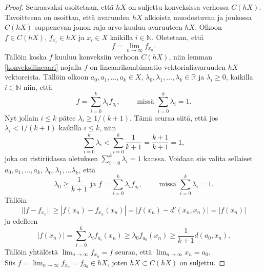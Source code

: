 \documentclass[12pt,a4paper,leqno]{report}
\newcommand{\R}{\mathbb{R}}
\newcommand{\N}{\mathbb{N}}
\theoremstyle{plain}
\theoremstyle{definition}
\theoremstyle{remark}
\begin{document}
\begin{proof}
Seuraavaksi osoitetaan, että $hX$ on suljettu konveksissa verhossa $C(hX)$. 
Tavoitteena on osoittaa, että avaruuden $hX$ alkioista muodostuvan ja joukossa $C(hX)$ suppenevan jonon raja-arvo kuuluu avaruuteen $ hX$. 
Olkoon $f\in C(hX)$, $f_{x_i}\in hX$ ja $ x_i\in X$ kaikilla $ i\in \N$. 
Oletetaan, että 
$$f=\lim_{n\rightarrow\infty} f_{x_n}.$$ 
Tällöin koska $f$ kuuluu konveksiin verhoon $C(hX)$, niin lemman \ref{konveksilineaari} nojalla $f$ on lineaarikombinaatio vektorialiavaruuden $hX$ vektoreista. Tällöin olkoon $a_0,a_1,\dots, a_k \in X$, $\lambda_0,\lambda_1,\dots, \lambda_k \in \R$ ja $\lambda_i\geq 0$, kaikilla $ i\in\N$ niin, että 
$$f=\sum_{i=0}^k \lambda_i f_{a_i},\qquad \text{ missä } \sum_{i=0}^k \lambda_i =1.$$
Nyt jollain $i\leq k$ pätee $\lambda_i \geq 1/(k+1)$. Tämä seuraa siitä, että jos $\lambda_i<1/(k+1)$ kaikilla $i\leq k$, niin
$$\sum_{i=0}^k \lambda_i < \sum_{i=0}^k \dfrac{1}{k+1}=\dfrac{k+1}{k+1}=1,$$
joka on ristiriidassa oletuksen $\sum_{i=0}^k \lambda_i =1$ kanssa.
Voidaan siis valita sellaiset $a_0,a_1,\dots, a_k$, $\lambda_0,\lambda_1,\dots \lambda_k$, että 
$$\lambda_0\geq \dfrac{1}{k+1}\text{ ja }f=\sum_{i=0}^k \lambda_i f_{a_i},\qquad \text{ missä } \sum_{i=0}^k \lambda_i =1 .$$ 
Tällöin 
$$||f-f_{x_n}||\geq |f(x_n)-f_{x_n}(x_n)|=|f(x_n)-d'(x_n,x_n)|=|f(x_n)|$$ 
ja edelleen
$$|f(x_n)|=\sum_{i=0}^k \lambda_i f_{a_i}(x_n)\geq \lambda_0 f_{a_0}(x_n)\geq \dfrac{1}{k+1}d(a_0,x_n).$$
Tällöin yhtälöstä $\lim_{n\rightarrow\infty} f_{x_n}=f$ seuraa, että $\lim_{n\rightarrow\infty }x_n=a_0$. \\
Siis $ f=\lim_{n\rightarrow\infty} f_{x_n}=f_{a_0}\in hX$, joten $hX\subset C(hX)$ on suljettu.

\end{proof}
\end{document}
